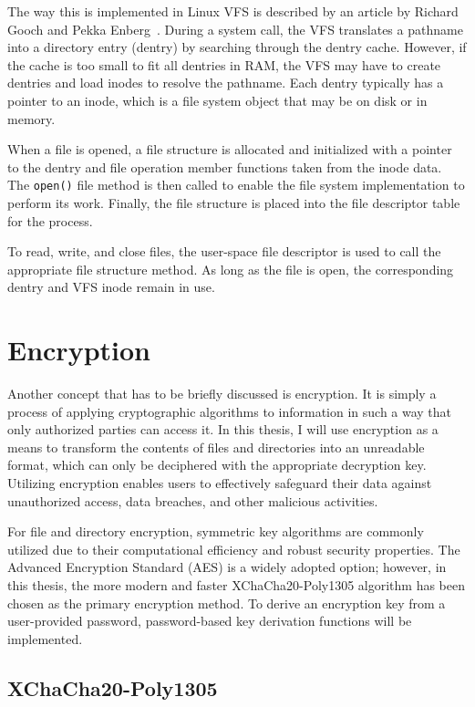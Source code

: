The way this is implemented in Linux VFS is described by an article by Richard Gooch and Pekka Enberg~\cite{vfs}.
During a system call, the VFS translates a pathname into a directory entry (dentry) by searching through the dentry cache.
However, if the cache is too small to fit all dentries in RAM, the VFS may have to create dentries and load inodes to resolve the pathname.
Each dentry typically has a pointer to an inode, which is a file system object that may be on disk or in memory.

When a file is opened, a file structure is allocated and initialized with a pointer to the dentry and file operation member functions taken from the inode data.
The \texttt{open()} file method is then called to enable the file system implementation to perform its work.
Finally, the file structure is placed into the file descriptor table for the process.

To read, write, and close files, the user-space file descriptor is used to call the appropriate file structure method.
As long as the file is open, the corresponding dentry and VFS inode remain in use.


\section{Encryption}\label{sec:encryption-approaches}

Another concept that has to be briefly discussed is encryption.
It is simply a process of applying cryptographic algorithms to information in such a way that only authorized parties can access it.
In this thesis, I will use encryption as a means to transform the contents of files and directories into an unreadable format, which can only be deciphered with the appropriate decryption key.
Utilizing encryption enables users to effectively safeguard their data against unauthorized access, data breaches, and other malicious activities.

For file and directory encryption, symmetric key algorithms are commonly utilized due to their computational efficiency and robust security properties.
The Advanced Encryption Standard (AES) is a widely adopted option; however, in this thesis, the more modern and faster XChaCha20-Poly1305 algorithm has been chosen as the primary encryption method.
To derive an encryption key from a user-provided password, password-based key derivation functions will be implemented.

\subsection{XChaCha20-Poly1305}\label{subsec:xchacha20-poly1305}

